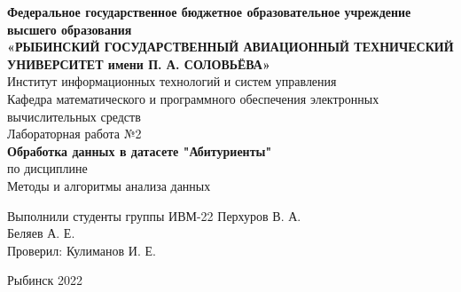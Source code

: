 \documentclass[a4paper]{article}
\begin{document}
\begin {center}
    \hfill \break
    \textbf{Федеральное государственное бюджетное образовательное учреждение высшего образования}\\
    \small{\textbf{«РЫБИНСКИЙ ГОСУДАРСТВЕННЫЙ АВИАЦИОННЫЙ ТЕХНИЧЕСКИЙ УНИВЕРСИТЕТ имени П. А. СОЛОВЬЁВА»}}\\
    \hfill \break
    \normalsize{Институт информационных технологий и систем управления}\\
    \hfill \break
    \normalsize{Кафедра математического и программного обеспечения электронных вычислительных средств}\\
    \hfill\break
    \hfill \break
    \hfill \break
    \hfill \break
    \large{Лабораторная работа №2}\\
    \normalsize{\textbf{Обработка данных в датасете "Абитуриенты"}}\\
    \hfill \break
    \hfill \break
    \hfill \break
    \normalsize{по дисциплине\\
Методы и алгоритмы анализа данных\\}
    \hfill \break
    \hfill \break
    \hfill \break
    \hfill \break
    \hfill \break
\end {center}

\begin {flushleft}
\normalsize{ 
    Выполнили студенты 
    группы ИВМ-22  
    \hfill Перхуров В. А. \\
    \hfill Беляев А. Е. \\
    \hfill \break
    Проверил: 
    \hfill Кулиманов И. Е. 
}
\end {flushleft}

\hfill \break
\hfill \break
\hfill \break
\hfill \break
\hfill \break
\hfill \break
\hfill \break

\begin{center} 
    Рыбинск 2022 
\end{center}
\thispagestyle{empty} 

\end{document}
